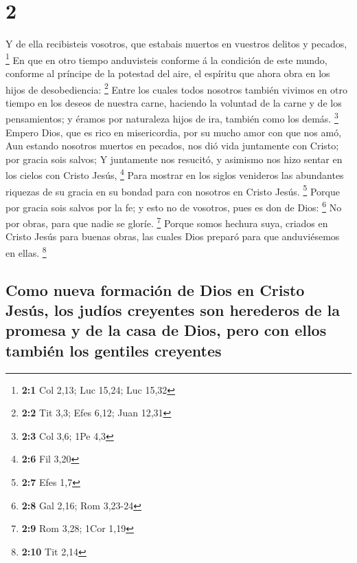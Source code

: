 \hypertarget{section-1}{%
\section{2}\label{section-1}}

 Y de ella recibisteis vosotros, que estabais muertos en
vuestros delitos y pecados, \footnote{\textbf{2:1} Col 2,13; Luc 15,24;
  Luc 15,32}  En que en otro tiempo anduvisteis conforme á
la condición de este mundo, conforme al príncipe de la potestad del
aire, el espíritu que ahora obra en los hijos de desobediencia:
\footnote{\textbf{2:2} Tit 3,3; Efes 6,12; Juan 12,31} 
Entre los cuales todos nosotros también vivimos en otro tiempo en los
deseos de nuestra carne, haciendo la voluntad de la carne y de los
pensamientos; y éramos por naturaleza hijos de ira, también como los
demás. \footnote{\textbf{2:3} Col 3,6; 1Pe 4,3}  Empero
Dios, que es rico en misericordia, por su mucho amor con que nos amó,
 Aun estando nosotros muertos en pecados, nos dió vida
juntamente con Cristo; por gracia sois salvos;  Y
juntamente nos resucitó, y asimismo nos hizo sentar en los cielos con
Cristo Jesús, \footnote{\textbf{2:6} Fil 3,20}  Para
mostrar en los siglos venideros las abundantes riquezas de su gracia en
su bondad para con nosotros en Cristo Jesús. \footnote{\textbf{2:7} Efes
  1,7}  Porque por gracia sois salvos por la fe; y esto no
de vosotros, pues es don de Dios: \footnote{\textbf{2:8} Gal 2,16; Rom
  3,23-24}  No por obras, para que nadie se gloríe.
\footnote{\textbf{2:9} Rom 3,28; 1Cor 1,19}  Porque somos
hechura suya, criados en Cristo Jesús para buenas obras, las cuales Dios
preparó para que anduviésemos en ellas. \footnote{\textbf{2:10} Tit 2,14}

\hypertarget{como-nueva-formaciuxf3n-de-dios-en-cristo-jesuxfas-los-juduxedos-creyentes-son-herederos-de-la-promesa-y-de-la-casa-de-dios-pero-con-ellos-tambiuxe9n-los-gentiles-creyentes}{%
\subsection{Como nueva formación de Dios en Cristo Jesús, los judíos
creyentes son herederos de la promesa y de la casa de Dios, pero con
ellos también los gentiles
creyentes}\label{como-nueva-formaciuxf3n-de-dios-en-cristo-jesuxfas-los-juduxedos-creyentes-son-herederos-de-la-promesa-y-de-la-casa-de-dios-pero-con-ellos-tambiuxe9n-los-gentiles-creyentes}}

